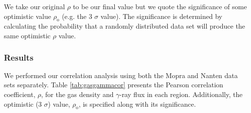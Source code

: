 \documentclass[12pt,a4paper]{article}
\begin{document}
We take our original $\rho$ to be our final value but we quote the significance of some optimistic value $\rho_\mathrm{o}$ (e.g. the 3 $\sigma$ value). The significance is determined by calculating the probability that a randomly distributed data set will produce the same optimistic $\rho$ value.


\subsubsection{Results}
We performed our correlation analysis using both the Mopra and Nanten data sets separately. 
Table \ref{tab:gasgammacor} presents the Pearson correlation coefficient, $\rho$, for the gas density and $\gamma$-ray flux in each region. 
Additionally, the optimistic (3 $\sigma$) value, $\rho_\mathrm{o}$, is specified along with its significance.
\end{document}
